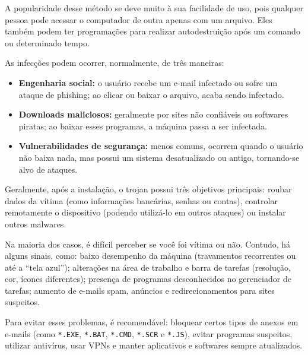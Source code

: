 	A popularidade desse método se deve muito à sua facilidade de uso, pois qualquer pessoa pode acessar o computador de outra apenas com um arquivo. Eles também podem ter programações para realizar autodestruição após um comando ou determinado tempo.
	
	As infecções podem ocorrer, normalmente, de três maneiras:
	\begin{itemize}
		\item \textbf{Engenharia social:} o usuário recebe um e-mail infectado ou sofre um ataque de phishing; ao clicar ou baixar o arquivo, acaba sendo infectado.
		\item \textbf{Downloads maliciosos:} geralmente por sites não confiáveis ou softwares piratas; ao baixar esses programas, a máquina passa a ser infectada.
		\item \textbf{Vulnerabilidades de segurança:} menos comuns, ocorrem quando o usuário não baixa nada, mas possui um sistema desatualizado ou antigo, tornando-se alvo de ataques.
	\end{itemize}
	
	Geralmente, após a instalação, o trojan possui três objetivos principais: roubar dados da vítima (como informações bancárias, senhas ou contas), controlar remotamente o dispositivo (podendo utilizá-lo em outros ataques) ou instalar outros malwares.
	
	Na maioria dos casos, é difícil perceber se você foi vítima ou não. Contudo, há alguns sinais, como: baixo desempenho da máquina (travamentos recorrentes ou até a ``tela azul''); alterações na área de trabalho e barra de tarefas (resolução, cor, ícones diferentes); presença de programas desconhecidos no gerenciador de tarefas; aumento de e-mails spam, anúncios e redirecionamentos para sites suspeitos.
	
	Para evitar esses problemas, é recomendável: bloquear certos tipos de anexos em e-mails (como \texttt{*.EXE}, \texttt{*.BAT}, \texttt{*.CMD}, \texttt{*.SCR} e \texttt{*.JS}), evitar programas suspeitos, utilizar antivírus, usar VPNs e manter aplicativos e softwares sempre atualizados.
	
